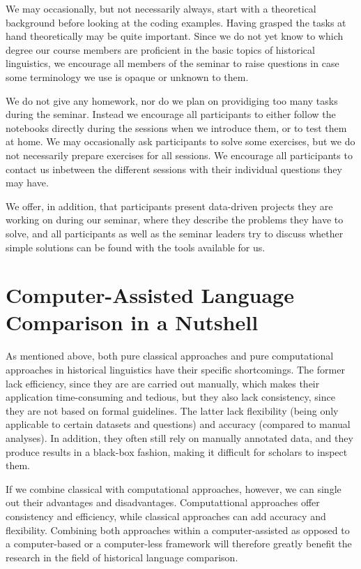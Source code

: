 We may occasionally, but not necessarily always, start with a
theoretical background before looking at the coding examples. Having
grasped the tasks at hand theoretically may be quite important. Since we
do not yet know to which degree our course members are proficient in the
basic topics of historical linguistics, we encourage all members of the
seminar to raise questions in case some terminology we use is opaque or
unknown to them.

We do not give any homework, nor do we plan on providiging too many
tasks during the seminar. Instead we encourage all participants to
either follow the notebooks directly during the sessions when we
introduce them, or to test them at home. We may occasionally ask
participants to solve some exercises, but we do not necessarily prepare
exercises for all sessions. We encourage all participants to contact us
inbetween the different sessions with their individual questions they
may have.

We offer, in addition, that participants present data-driven projects
they are working on during our seminar, where they describe the problems
they have to solve, and all participants as well as the seminar leaders
try to discuss whether simple solutions can be found with the tools
available for us.

\section{Computer-Assisted Language Comparison in a
Nutshell}\label{computer-assisted-language-comparison-in-a-nutshell}

As mentioned above, both pure classical approaches and pure
computational approaches in historical linguistics have their specific
shortcomings. The former lack efficiency, since they are are carried out
manually, which makes their application time-consuming and tedious, but
they also lack consistency, since they are not based on formal
guidelines. The latter lack flexibility (being only applicable to
certain datasets and questions) and accuracy (compared to manual
analyses). In addition, they often still rely on manually annotated
data, and they produce results in a black-box fashion, making it
difficult for scholars to inspect them.

If we combine classical with computational approaches, however, we can
single out their advantages and disadvantages. Computattional approaches
offer consistency and efficiency, while classical approaches can add
accuracy and flexibility. Combining both approaches within a
computer-assisted as opposed to a computer-based or a computer-less
framework will therefore greatly benefit the research in the field of
historical language comparison.

